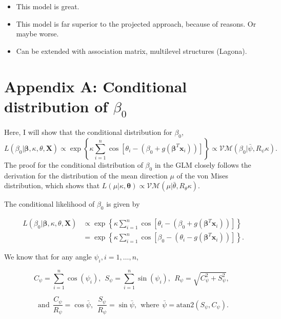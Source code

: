 \documentclass[12pt,a4paper]{article}
\begin{document}
\begin{itemize}
\item This model is great.
\item This model is far superior to the projected approach, because of reasons. Or maybe worse. 
\item Can be extended with association matrix, multilevel structures (Lagona).
\end{itemize}









\section*{Appendix A: Conditional distribution of $\beta_0$} \label{beta0}

Here, I will show that the conditional distribution for $\beta_0$,
$$ L(\beta_0 \vert \boldsymbol\beta, \kappa, \theta, \boldsymbol{X}) \propto \exp \left\lbrace \kappa \sum_{i=1}^n \cos \left[ \theta_i - (\beta_0 + g(\boldsymbol\beta^T \boldsymbol{x}_i)) \right]  \right\rbrace \propto \mathcal{VM}(\beta_0 \vert \bar\psi, R_{\psi}\kappa). $$
The proof for the conditional distribution of $\beta_0$ in the GLM closely follows the derivation for the distribution of the mean direction $\mu$ of the von Mises distribution, which shows that $L(\mu \vert \kappa, \boldsymbol\theta) \propto \mathcal{VM}(\mu \vert \bar\theta, R_{\theta} \kappa)$.

The conditional likelihood of $\beta_0$ is given by

\begin{align*}
L(\beta_0 \vert \boldsymbol\beta, \kappa, \theta, \boldsymbol{X}) & \propto \exp \left\lbrace \kappa \sum_{i=1}^n \cos \left[ \theta_i - (\beta_0 + g(\boldsymbol\beta^T \boldsymbol{x}_i)) \right] \right\rbrace \\
& = \exp \left\lbrace \kappa \sum_{i=1}^n \cos \left[ \beta_0 - (\theta_i - g(\boldsymbol\beta^T \boldsymbol{x}_i)) \right]  \right\rbrace.
\end{align*}

We know that for any angle $\psi_i, i = 1, \dots, n$,

$$ C_{\psi} = \sum_{i=1}^n \cos(\psi_i), ~~ S_{\psi} = \sum_{i=1}^n \sin(\psi_i), ~~ R_{\psi} = \sqrt{C_{\psi}^2 + S_{\psi}^2}, ~~ $$

$$ \text{and} ~~ \frac{C_{\psi}}{R_{\psi}} = \cos \bar\psi, ~~ \frac{S_{\psi}}{R_{\psi}} = \sin \bar\psi, ~~ \text{where} ~~ \bar\psi = \text{atan2}(S_{\psi}, C_{\psi}). $$
\end{document}
